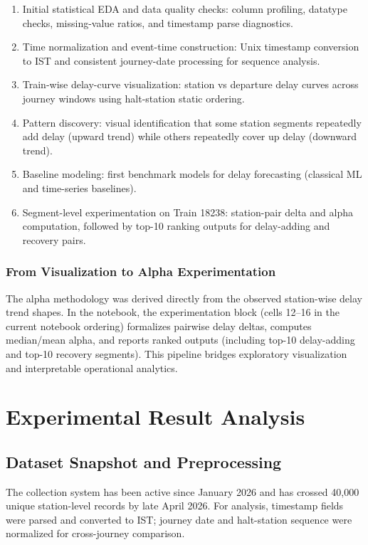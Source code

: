 \documentclass[12pt,a4paper]{report}
\begin{document}
\begin{enumerate}
    \item Initial statistical EDA and data quality checks: column profiling, datatype checks, missing-value ratios, and timestamp parse diagnostics.
    \item Time normalization and event-time construction: Unix timestamp conversion to IST and consistent journey-date processing for sequence analysis.
    \item Train-wise delay-curve visualization: station vs departure delay curves across journey windows using halt-station static ordering.
    \item Pattern discovery: visual identification that some station segments repeatedly add delay (upward trend) while others repeatedly cover up delay (downward trend).
    \item Baseline modeling: first benchmark models for delay forecasting (classical ML and time-series baselines).
    \item Segment-level experimentation on Train 18238: station-pair delta and alpha computation, followed by top-10 ranking outputs for delay-adding and recovery pairs.
\end{enumerate}

\subsection{From Visualization to Alpha Experimentation}
The alpha methodology was derived directly from the observed station-wise delay trend shapes. In the notebook, the experimentation block (cells 12--16 in the current notebook ordering) formalizes pairwise delay deltas, computes median/mean alpha, and reports ranked outputs (including top-10 delay-adding and top-10 recovery segments). This pipeline bridges exploratory visualization and interpretable operational analytics.

\chapter{Experimental Result Analysis}

\section{Dataset Snapshot and Preprocessing}
The collection system has been active since January 2026 and has crossed 40,000 unique station-level records by late April 2026. For analysis, timestamp fields were parsed and converted to IST; journey date and halt-station sequence were normalized for cross-journey comparison.
\end{document}
